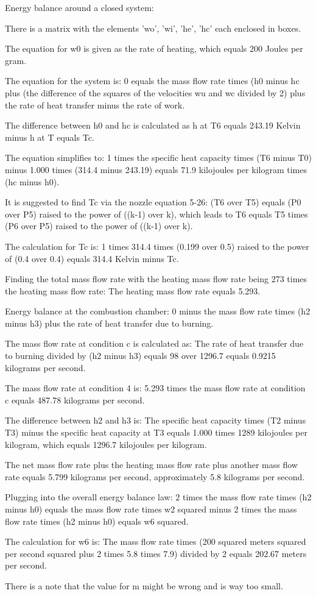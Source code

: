Energy balance around a closed system:

There is a matrix with the elements 'wo', 'wi', 'he', 'hc' each enclosed in boxes.

The equation for w0 is given as the rate of heating, which equals 200 Joules per gram.

The equation for the system is:
0 equals the mass flow rate times (h0 minus hc plus (the difference of the squares of the velocities wu and wc divided by 2) plus the rate of heat transfer minus the rate of work.

The difference between h0 and hc is calculated as h at T6 equals 243.19 Kelvin minus h at T equals Tc.

The equation simplifies to:
1 times the specific heat capacity times (T6 minus T0) minus 1.000 times (314.4 minus 243.19) equals 71.9 kilojoules per kilogram times (hc minus h0).

It is suggested to find Tc via the nozzle equation 5-26:
(T6 over T5) equals (P0 over P5) raised to the power of ((k-1) over k), which leads to T6 equals T5 times (P6 over P5) raised to the power of ((k-1) over k).

The calculation for Tc is:
1 times 314.4 times (0.199 over 0.5) raised to the power of (0.4 over 0.4) equals 314.4 Kelvin minus Tc.

Finding the total mass flow rate with the heating mass flow rate being 273 times the heating mass flow rate:
The heating mass flow rate equals 5.293.

Energy balance at the combustion chamber:
0 minus the mass flow rate times (h2 minus h3) plus the rate of heat transfer due to burning.

The mass flow rate at condition c is calculated as:
The rate of heat transfer due to burning divided by (h2 minus h3) equals 98 over 1296.7 equals 0.9215 kilograms per second.

The mass flow rate at condition 4 is:
5.293 times the mass flow rate at condition c equals 487.78 kilograms per second.

The difference between h2 and h3 is:
The specific heat capacity times (T2 minus T3) minus the specific heat capacity at T3 equals 1.000 times 1289 kilojoules per kilogram, which equals 1296.7 kilojoules per kilogram.

The net mass flow rate plus the heating mass flow rate plus another mass flow rate equals 5.799 kilograms per second, approximately 5.8 kilograms per second.

Plugging into the overall energy balance law:
2 times the mass flow rate times (h2 minus h0) equals the mass flow rate times w2 squared minus 2 times the mass flow rate times (h2 minus h0) equals w6 squared.

The calculation for w6 is:
The mass flow rate times (200 squared meters squared per second squared plus 2 times 5.8 times 7.9) divided by 2 equals 202.67 meters per second.

There is a note that the value for m might be wrong and is way too small.